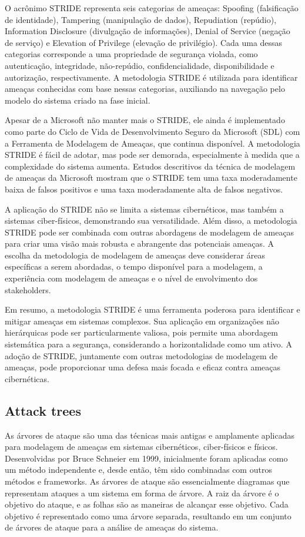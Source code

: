 O acrônimo STRIDE representa seis categorias de ameaças: Spoofing
(falsificação de identidade), Tampering (manipulação de dados), Repudiation (repúdio),
Information Disclosure (divulgação de informações), Denial of Service (negação de serviço)
e Elevation of Privilege (elevação de privilégio). Cada uma dessas categorias
corresponde a uma propriedade de segurança violada, como autenticação, integridade,
não-repúdio, confidencialidade, disponibilidade e autorização, respectivamente.
A metodologia STRIDE é utilizada para identificar ameaças conhecidas com base
nessas categorias, auxiliando na navegação pelo modelo do sistema criado na fase
inicial. 

Apesar de a Microsoft não manter mais o STRIDE, ele ainda é implementado como
parte do Ciclo de Vida de Desenvolvimento Seguro da Microsoft (SDL) com a Ferramenta
de Modelagem de Ameaças, que continua disponível. A metodologia
STRIDE é fácil de adotar, mas pode ser demorada, especialmente à medida que a
complexidade do sistema aumenta. Estudos descritivos da técnica de modelagem de ameaças da
Microsoft mostram que o STRIDE tem uma taxa moderadamente baixa de falsos positivos e
uma taxa moderadamente alta de falsos negativos. 

A aplicação do STRIDE não se limita a sistemas cibernéticos, mas também a
sistemas ciber-físicos, demonstrando sua versatilidade. Além disso, a metodologia
STRIDE pode ser combinada com outras abordagens de modelagem de ameaças para criar
uma visão mais robusta e abrangente das potenciais ameaças. A
escolha da metodologia de modelagem de ameaças deve considerar áreas específicas a
serem abordadas, o tempo disponível para a modelagem, a experiência com modelagem de
ameaças e o nível de envolvimento dos stakeholders. 

Em resumo, a metodologia STRIDE é uma ferramenta poderosa para identificar e
mitigar ameaças em sistemas complexos. Sua aplicação em organizações não hierárquicas
pode ser particularmente valiosa, pois permite uma abordagem sistemática para a
segurança, considerando a horizontalidade como um ativo. A adoção de STRIDE, juntamente
com outras metodologias de modelagem de ameaças, pode proporcionar uma defesa mais
focada e eficaz contra ameaças cibernéticas. 

\subsection{Attack trees}
\label{sec:attack_trees}

As árvores de ataque são uma das técnicas mais antigas e amplamente aplicadas
para modelagem de ameaças em sistemas cibernéticos, ciber-físicos e físicos.
Desenvolvidas por Bruce Schneier em 1999, inicialmente foram aplicadas como um método
independente e, desde então, têm sido combinadas com outros métodos e frameworks.
As árvores de ataque são essencialmente diagramas que representam ataques a um
sistema em forma de árvore. A raiz da árvore é o objetivo do ataque, e as folhas são
as maneiras de alcançar esse objetivo. Cada objetivo é representado como uma
árvore separada, resultando em um conjunto de árvores de ataque para a análise de
ameaças do sistema. 

